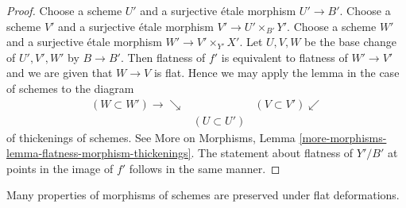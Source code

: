 \begin{proof}
Choose a scheme $U'$ and a surjective \'etale morphism $U' \to B'$.
Choose a scheme $V'$ and a surjective \'etale morphism
$V' \to U' \times_{B'} Y'$.
Choose a scheme $W'$ and a surjective \'etale morphism
$W' \to V' \times_{Y'} X'$. Let $U, V, W$ be the base change
of $U', V', W'$ by $B \to B'$. Then flatness of $f'$ is
equivalent to flatness of $W' \to V'$ and we are
given that $W \to V$ is flat. Hence we may apply the lemma
in the case of schemes to the diagram
$$
\begin{array}{ccc}(W \subset W') \longrightarrow\searrow &  & (V \subset V') \swarrow \\  & (U \subset U') & \end{array}
$$
of thickenings of schemes. See
More on Morphisms, Lemma
\ref{more-morphisms-lemma-flatness-morphism-thickenings}.
The statement about flatness of $Y'/B'$ at points in the
image of $f'$ follows in the same manner.
\end{proof}

Many properties of morphisms of schemes are preserved under flat
deformations.

